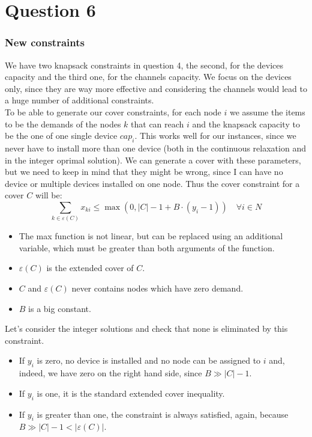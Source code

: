 \section{Question 6}

\subsubsection*{New constraints}

We have two knapsack constraints in question 4, the second, for the devices capacity and the third one, for the channels capacity. We focus on the devices only, since they are way more effective and considering the channels would lead to a huge number of additional constraints.  \\

To be able to generate our cover constraints, for each node $i$ we assume the items to be the demands of the nodes $k$ that can reach $i$ and the knapsack capacity to be the one of one single device $cap_i$. This works well for our instances, since we never have to install more than one device (both in the continuous relaxation and in the integer oprimal solution).
We can generate a cover with these parameters, but we need to keep in mind that they might be wrong, since I can have no device or multiple devices installed on one node. Thus the cover constraint for a cover $C$ will be:
$$
\sum_{k \in \varepsilon(C)} x_{ki} \leq \max(0, |C| - 1 + B \cdot (y_i - 1)) \quad \forall i \in N
$$

\begin{itemize}
	\item The max function is not linear, but can be replaced using an additional variable, which must be greater than both arguments of the function.
	\item $\varepsilon(C)$ is the extended cover of $C$.
	\item $C$ and $\varepsilon(C)$ never contains nodes which have zero demand.
	\item $B$ is a big constant.
\end{itemize}

Let's consider the integer solutions and check that none is eliminated by this constraint.
\begin{itemize}
	\item If $y_i$ is zero, no device is installed and no node can be assigned to $i$ and, indeed, we have zero on the right hand side, since $B \gg |C| - 1$.
	\item If $y_i$ is one, it is the standard extended cover inequality.
	\item If $y_i$ is greater than one, the constraint is always satisfied, again, because $B \gg |C| - 1 < |\varepsilon(C)|$.
\end{itemize}

